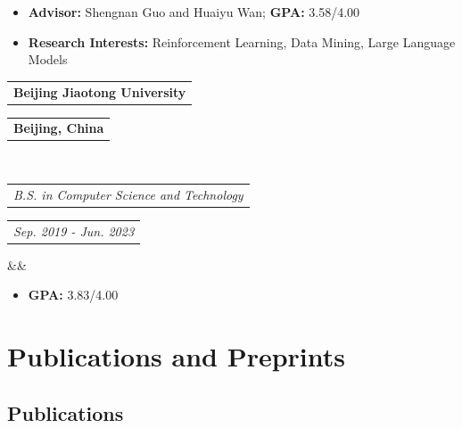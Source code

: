 \documentclass[11pt,a4paper,roman]{moderncv}        %
\makeatletter
\newcommand*{\customcventry}[7][.25em]{
	\begin{tabular}{@{}l} 
		{\bfseries #4}
	\end{tabular}
	\hfill%
	\begin{tabular}{l@{}}
		{\bfseries #5}
	\end{tabular} \\
	\begin{tabular}{@{}l} 
		{\itshape #3}
	\end{tabular}
	\hfill%
	\begin{tabular}{l@{}}
		{\itshape #2}
	\end{tabular}
	\ifx&#7&%
	\else{\\%
		\begin{minipage}{\maincolumnwidth}%
			\small#7%
	\end{minipage}}\fi%
	\par\addvspace{#1}}
\makeatother
\begin{document}
	\begin{itemize}
		\item[\textbullet] \textbf{Advisor:} Shengnan Guo and Huaiyu Wan; \textbf{GPA:} 3.58/4.00
		\item[\textbullet] \textbf{Research Interests:} Reinforcement Learning, Data Mining, Large Language Models
	\end{itemize}
	\vspace{1mm}
	
	{\customcventry{Sep. 2019 - Jun. 2023}{B.S. in Computer Science and Technology}{Beijing Jiaotong University}{Beijing, China}{}{}}
	
	\begin{itemize}
		\item[\textbullet] \textbf{GPA:} 3.83/4.00
	\end{itemize}




	
	
	\vspace*{-2mm}
	\section{Publications and Preprints}
    
    \subsection*{Publications}
    \vspace{2mm}
    
\end{document}
